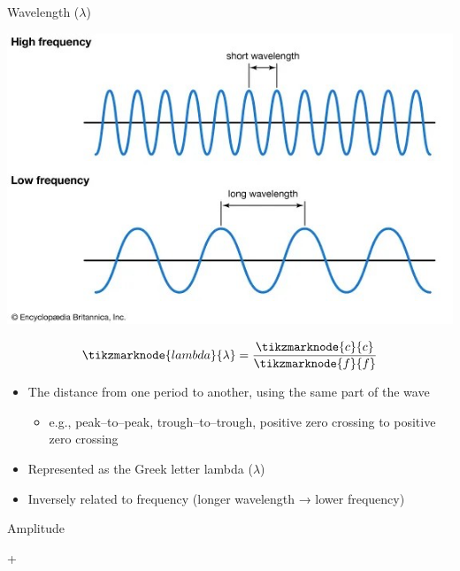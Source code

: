 \documentclass[professionalfonts]{beamer}
\begin{document}
\begin{frame}{Wavelength ($\lambda$)}
    \begin{multicols}{2}
        \begin{center}
            \includegraphics[width = \linewidth]{figs/Wavelength.png}
        \end{center}
        \vspace{3em}
        \begin{equation*}
            \tikzmarknode{lambda}{\lambda} = \frac{\tikzmarknode{c}{c}}{\tikzmarknode{f}{f}}
        \end{equation*}
        \columnbreak
        \begin{itemize}
            \item The distance from one period to another, using the same part of the wave
            \begin{itemize}
                \item e.g., peak–to–peak, trough–to–trough, positive zero crossing to positive zero crossing
            \end{itemize}
            \item Represented as the Greek letter lambda ($\lambda$)
            \item Inversely related to frequency (longer wavelength → lower frequency)
        \end{itemize}
    \end{multicols}
\end{frame}

\begin{frame}{Amplitude}
    \begin{multicols}{2}
        
        \columnbreak
+
    \end{multicols}
\end{frame}
\end{document}
